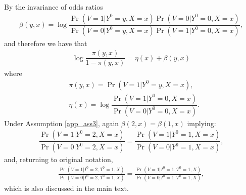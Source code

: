 \begin{appendix}
By the invariance of odds ratios 
\begin{align*}
    \beta(y, x) = \log \dfrac{\Pr(V = 1 | Y^0 = y, X = x)\Pr(V = 0 | Y^0 = 0, X = x)}{\Pr(V = 0 | Y^0 = y, X = x)\Pr(V = 1 | Y^0 = 0, X = x)},
\end{align*}
and therefore we have that
\begin{align*}
    \log \dfrac{\pi(y, x)}{1 - \pi(y, x)} = \eta(x) + \beta(y, x)
\end{align*}
where
\begin{align*}
    &\pi(y, x) = \Pr(V = 1 | Y^0 = y, X = x), \\
    &\eta(x) = \log \dfrac{\Pr(V = 1 | Y^0 = 0, X = x)}{\Pr(V = 0 | Y^0 = 0, X = x)}.
\end{align*}
Under Assumption \ref{app_ass3}, again $\beta(2, x) = \beta(1, x)$ implying: 
\begin{align*}
    \dfrac{\Pr(V = 1 | Y^0 = 2, X = x)}{\Pr(V = 0 | Y^0 = 2, X = x)} = \dfrac{\Pr(V = 1 | Y^0 = 1, X = x)}{\Pr(V = 0 | Y^0 = 1, X = x)},
\end{align*}
and, returning to original notation,
\begin{align*}
    \frac{\Pr(V = 1 | I^0 = 2, T^0 = 1, X)}{\Pr(V = 0 | I^0 = 2, T^0 = 1, X)} =\frac{\Pr(V = 1 | I^0 = 1, T^0 = 1, X)}{\Pr(V = 0 | I^0 = 1, T^0 = 1, X)},
\end{align*}
which is also discussed in the main text. 


\end{appendix}
